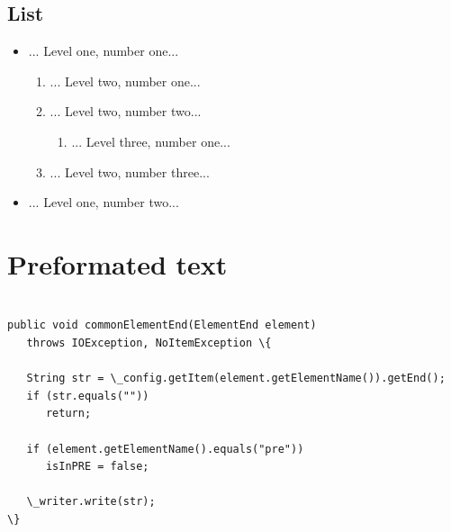 \documentclass[a4paper,11pt]{article} \usepackage{ulem}
\begin{document}
\subsection{List}
\begin{itemize}
\item ... Level one, number one...
  \begin{enumerate}
  \item ... Level two, number one...
  \item ... Level two, number two...
    \begin{enumerate}
    \item ... Level three, number one...
    \end{enumerate}
  \item ... Level two, number three...
  \end{enumerate}
\item ... Level one, number two...
\end{itemize}

\section{Preformated text}
\begin{verbatim}

public void commonElementEnd(ElementEnd element)
   throws IOException, NoItemException \{
        
   String str = \_config.getItem(element.getElementName()).getEnd();
   if (str.equals(""))
      return;
        
   if (element.getElementName().equals("pre"))
      isInPRE = false;
       
   \_writer.write(str);
\}
\end{verbatim}
\end{document}
